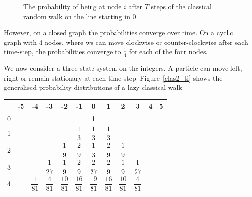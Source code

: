 \documentclass[a0,portrait]{a0poster}
\begin{document}
\begin{center}
{\begin{figure}
\caption{The probability of being at node $i$ after $T$ steps of the classical random walk on the line starting in 0.}
\label{clas_ti}
\end{figure}    

However, on a closed graph the probabilities converge over time. On a cyclic graph with 4 nodes, where we can move clockwise or counter-clockwise after each time-step, the probabilities converge to $\frac{1}{4}$ for each of the four nodes.

We now consider a three state system on the integers. A particle can move left, right or remain stationary at each time step. Figure~\ref{clas2_ti} shows the generalised probability distributions of a lazy classical walk.

\begin{center}
\small
\begin{tabular}{|c||c|c|c|c|c|c|c|c|c|c|c|}
\hline 
& -5 & -4 & -3 & -2 & -1 & 0 & 1 & 2 & 3 & 4 & 5 \\
\hline \hline
\hspace*{\fill} 0 \hspace*{\fill} &  &  &  &  &  & 1 &  &  &  &  & \\
\hline 
1 &  &  &  &  & 
$\dfrac{ 1 }{ 3 }$ &
$\dfrac{ 1 }{ 3 }$ &
$\dfrac{ 1 }{ 3 }$ &  &  &  & 
\hspace*{\fill} \\
\hline 
2 &  &  &  & 
$\dfrac{1}{9}$ & 
$\dfrac{ 2 }{ 9 }$ & 
$\dfrac{1}{3}$ & 
$\dfrac{ 2 }{ 9 }$ & 
$\dfrac{1}{9}$ &  &  & 
\hspace*{\fill} \\
\hline 
3 &  &  &  
$\dfrac{1}{27}$ &  
$\dfrac{ 1 }{ 9 }$ & 
$\dfrac{2}{9}$ &  
$\dfrac{ 2 }{ 27 }$ & 
$\dfrac{2}{9}$ &  
$\dfrac{ 1 }{ 9 }$ & 
$\dfrac{1}{27}$  &  & 
\hspace*{\fill} \\
\hline 
4 &  &
\hspace*{\fill} $\dfrac{1}{81}$ \hspace*{\fill} & 
$\dfrac{ 4 }{ 81 }$ & 
\hspace*{\fill} $\dfrac{10}{81}$ \hspace*{\fill} &  
$\dfrac{ 16 }{ 81 }$ & 
\hspace*{\fill} $\dfrac{19}{81}$ \hspace*{\fill} &  
$\dfrac{ 16 }{ 81 }$ & 
\hspace*{\fill} $\dfrac{10}{81}$ \hspace*{\fill} &  
$\dfrac{ 4 }{ 81 }$ & 

\end{tabular}
\end{center}}
\end{center}
\end{document}
